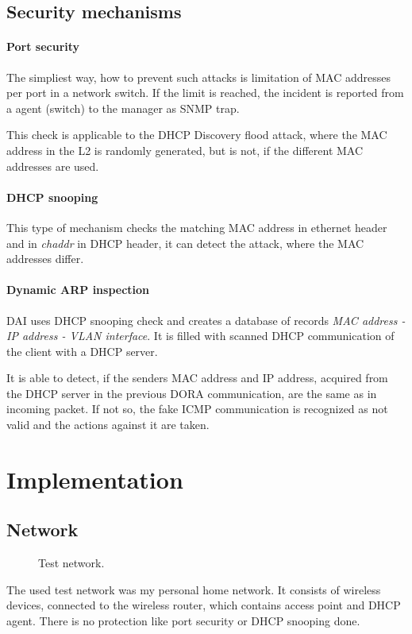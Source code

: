 \documentclass[10pt,a4paper,titlepage]{article}
\begin{document}
    
    
    \subsection*{Security mechanisms}
    
    \paragraph{Port security}
    The simpliest way, how to prevent such attacks is limitation of MAC addresses
    per port in a network switch. If the limit is reached, the incident is reported
    from a agent (switch) to the manager as SNMP trap.
    
    This check is applicable to the DHCP Discovery flood attack, where the MAC address
    in the L2 is randomly generated, but is not, if the different MAC addresses are used.
    
    \paragraph{DHCP snooping}
    This type of mechanism checks the matching MAC address in ethernet header
    and in {\it chaddr} in DHCP header, it can detect the attack, where the MAC
    addresses differ.
    
    \paragraph{Dynamic ARP inspection}
    DAI uses DHCP snooping check and creates a database of records {\it MAC address
    - IP address - VLAN interface}. It is filled with scanned DHCP communication
    of the client with a DHCP server.
    
    It is able to detect, if the senders MAC address and IP address, acquired from
    the DHCP server in the previous DORA communication, are the same as in
    incoming packet. If not so, the fake ICMP communication is recognized as not
    valid and the actions against it are taken. \cite{DHCPstarvation}
    
    
    \section*{Implementation}
    
    \subsection*{Network}
    \begin{figure}[h!]
        \begin{center}
            \caption{ Test network. \label{fig:network} \cite{laptop}}
        \end{center}
    \end{figure}
    The used test network was my personal home network. It consists of wireless
    devices, connected to the wireless router, which contains access point and DHCP agent.
    There is no protection like port security or DHCP snooping done.
    
\end{document}
